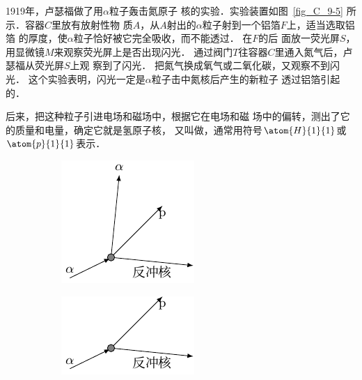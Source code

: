 1919年，卢瑟福做了用$\alpha$粒子轰击氮原子
核的实验．实验装置如图~\ref{fig_C_9-5} 所示．容器$C$里放有放射性物
质$A$，从$A$射出的$\alpha$粒子射到一个铝箔$F$上，适当选取铝箔
的厚度，使$\alpha$粒子恰好被它完全吸收，而不能透过．
在$F$的后
面放一荧光屏$S$，用显微镜$M$来观察荧光屏上是否出现闪光．
通过阀门$T$往容器$C$里通入氮气后，卢瑟福从荧光屏$S$上观
察到了闪光．
把氮气换成氧气或二氧化碳，又观察不到闪光．
这个实验表明，闪光一定是$\alpha$粒子击中氮核后产生的新粒子
透过铝箔引起的．

后来，把这种粒子引进电场和磁场中，根据它在电场和磁
场中的偏转，测出了它的质量和电量，确定它就是氢原子核，
又叫做，通常用符号$\atom{H}{1}{1}$或$\atom{p}{1}{1}$表示．
\begin{figure}[htbp]
    \centering
    \begin{subfigure}{0.3\linewidth}
        \centering
        \includegraphics{fig/C/9-6a.pdf}
        \caption{}\label{fig_C_9-6a}
    \end{subfigure}
    \hfil
    \begin{subfigure}{0.3\linewidth}
        \centering
        \includegraphics{fig/C/9-6b.pdf}
        \caption{}\label{fig_C_9-6b}
    \end{subfigure}
    \caption{}\label{fig_C_9-6}
\end{figure}

